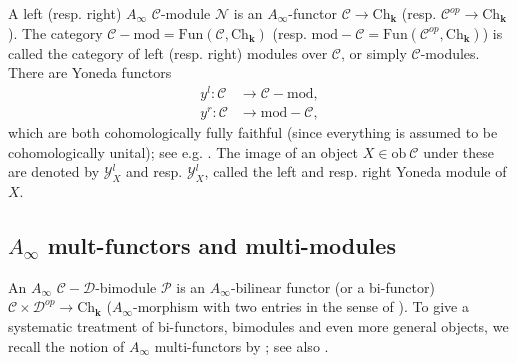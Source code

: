 \documentclass[11pt]{amsproc}
\def\K{{\mathbf{k}}}
\def\n{\mathcal{N}}
\def\Y{\mathcal{Y}}
\def\cP{\mathcal{P}}
\def\cc{\mathcal{C}}
\def\dd{\mathcal{D}}
\def\mod{\mathrm{\!-\! mod}}
\def\rmod{\mathrm{mod\!-\!}}
\def\ainf{A_\infty}
\def\ob{\mathrm{ob\ }}
\def\ch{\mathrm{Ch}}
\def\fun{\mathrm{Fun}}
\def\n{\mathcal{N}}
\theoremstyle{remark}
\numberwithin{equation}{section}
\begin{document}
A left (resp. right) $\ainf$ $\cc$-module $\n$ is an $\ainf$-functor $\cc \to \ch_{\K}$ (resp. $\cc^{op} \to \ch_{\K}$).
The category $\cc \mod = \fun(\cc, \ch_{\K})$ (resp. $\rmod \cc = \fun(\cc^{op}, \ch_{\K})$) is called the category of left (resp. right) modules over $\cc$, or simply $\cc$-modules.
There are Yoneda functors
\begin{equation}
\begin{split}
y^{l}: \cc & \to \cc \mod, \\
y^{r}: \cc & \to \rmod \cc,
\end{split}
\end{equation}
which are both cohomologically fully faithful (since everything is assumed to be cohomologically unital);
see e.g. \cite[\S(2g)]{seidel_book}.
The image of an object $X \in \ob \cc$ under these are denoted by $\Y^{l}_{X}$ and resp. $\Y^{l}_{X}$,
called the left and resp. right Yoneda module of $X$.

\subsection{$A_{\infty}$ mult-functors and multi-modules}

An $\ainf$ $\cc-\dd$-bimodule $\cP$ is an $\ainf$-bilinear functor (or a bi-functor) $\cc \times \dd^{op} \to \ch_{\K}$ ($A_{\infty}$-morphism with two entries in the sense of \cite{lyubashenkomulti}).
To give a systematic treatment of bi-functors, bimodules and even more general objects, 
we recall the notion of $\ainf$ multi-functors by \cite{lyubashenkomulti}; see also \cites{sheridan, fukaya_fun}.
\end{document}
